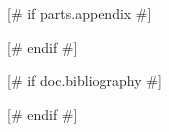 \documentclass[qe,nameyear,draft]{econsocart}
[# else #]
\theoremstyle{plain}
\theoremstyle{remark}
\begin{document}
%

[# if parts.appendix #]
\begin{appendix}
\end{appendix}
[# endif #]



[# if doc.bibliography #]

[# endif #]

\end{document}
